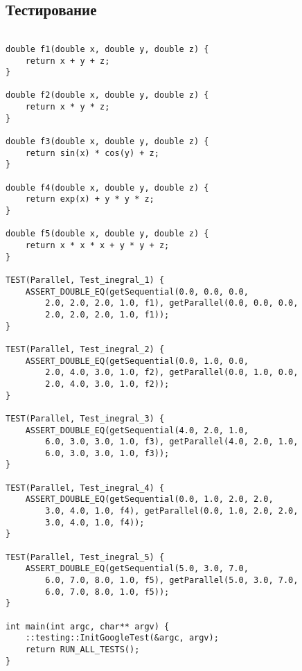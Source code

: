 \documentclass[14pt, a4paper]{extarticle}
\begin{document}
\subsection{Тестирование}
\begin{lstlisting}

double f1(double x, double y, double z) {
    return x + y + z;
}

double f2(double x, double y, double z) {
    return x * y * z;
}

double f3(double x, double y, double z) {
    return sin(x) * cos(y) + z;
}

double f4(double x, double y, double z) {
    return exp(x) + y * y * z;
}

double f5(double x, double y, double z) {
    return x * x * x + y * y + z;
}

TEST(Parallel, Test_inegral_1) {
    ASSERT_DOUBLE_EQ(getSequential(0.0, 0.0, 0.0,
        2.0, 2.0, 2.0, 1.0, f1), getParallel(0.0, 0.0, 0.0,
        2.0, 2.0, 2.0, 1.0, f1));
}

TEST(Parallel, Test_inegral_2) {
    ASSERT_DOUBLE_EQ(getSequential(0.0, 1.0, 0.0,
        2.0, 4.0, 3.0, 1.0, f2), getParallel(0.0, 1.0, 0.0,
        2.0, 4.0, 3.0, 1.0, f2));
}

TEST(Parallel, Test_inegral_3) {
    ASSERT_DOUBLE_EQ(getSequential(4.0, 2.0, 1.0,
        6.0, 3.0, 3.0, 1.0, f3), getParallel(4.0, 2.0, 1.0,
        6.0, 3.0, 3.0, 1.0, f3));
}

TEST(Parallel, Test_inegral_4) {
    ASSERT_DOUBLE_EQ(getSequential(0.0, 1.0, 2.0, 2.0,
        3.0, 4.0, 1.0, f4), getParallel(0.0, 1.0, 2.0, 2.0,
        3.0, 4.0, 1.0, f4));
}

TEST(Parallel, Test_inegral_5) {
    ASSERT_DOUBLE_EQ(getSequential(5.0, 3.0, 7.0,
        6.0, 7.0, 8.0, 1.0, f5), getParallel(5.0, 3.0, 7.0,
        6.0, 7.0, 8.0, 1.0, f5));
}

int main(int argc, char** argv) {
    ::testing::InitGoogleTest(&argc, argv);
    return RUN_ALL_TESTS();
}

\end{lstlisting}
\end{document}
